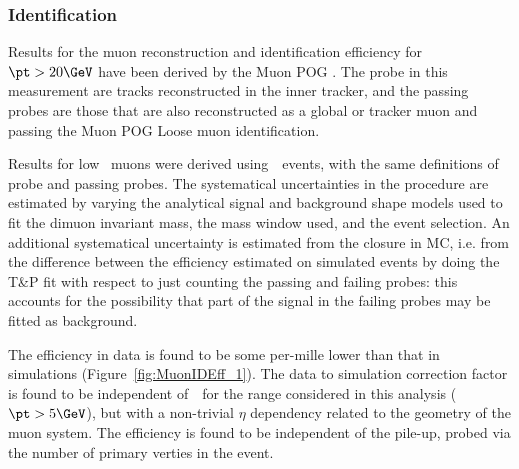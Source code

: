 \subsubsection{Identification}
Results for the muon reconstruction and identification efficiency for $\pt > 20\GeV$
have been derived by the Muon POG \cite{MuonReferenceEffsRun2}.
The probe in this measurement are tracks reconstructed in the inner tracker, and
the passing probes are those that are also reconstructed as a global or tracker muon
and passing the Muon POG Loose muon identification.

Results for low \pt~muons were derived using~\jpsi~events, with the same definitions
of probe and passing probes. The systematical uncertainties in the procedure
are estimated by varying the analytical signal and background shape models used to fit the dimuon invariant mass,
the mass window used, and the event selection. An additional systematical
uncertainty is estimated from the closure in MC, i.e. from the difference
between the efficiency estimated on simulated events by doing the T\&P fit
with respect to just counting the passing and failing probes: this accounts
for the possibility that part of the signal in the failing probes may be
fitted as background.

The efficiency in data is found to be some per-mille lower than
that in simulations (Figure~\ref{fig:MuonIDEff_1}). The data to simulation correction factor is found to be
independent of~\pt~for the range considered in this analysis ($\pt > 5\GeV$), but with a non-trivial $\eta$
dependency related to the geometry of the muon system.
The efficiency is found to be independent of the pile-up, probed via the number of primary verties in the event.

